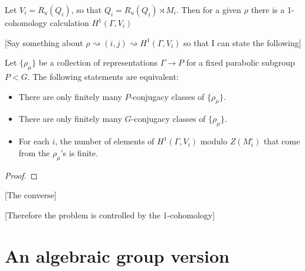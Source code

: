 Let $V_i= R_u(Q_i)$, so that $Q_i = R_u(Q_i)\rtimes M_i$. Then for a given $\rho$ there is a 1-cohomology calculation $H^1(\Gamma,V_i)$

[Say something about $\rho \rightsquigarrow (i,j) \rightsquigarrow H^1(\Gamma,V_i)$ so that I can state the following]

\begin{lemma} Let $\{\rho_\mu\}$ be a collection of representations $\Gamma\rightarrow P$ for a fixed parabolic subgroup $P<G$. The following statements are equivalent:
	\begin{itemize}
		\item There are only finitely many $P$-conjugacy classes of $\{\rho_\mu\}$.
		\item There are only finitely many $G$-conjugacy classes of $\{\rho_\mu\}$.
		\item For each $i$, the number of elements of $H^1(\Gamma, V_i)$ modulo $Z(M_i^\circ)$ that come from the $\rho_\mu$'s is finite.
	\end{itemize}
\end{lemma}
\begin{proof}
\end{proof}

% 
% 
% 
% 

[The converse]

[Therefore the problem is controlled by the 1-cohomology]

\section{An algebraic group version}

